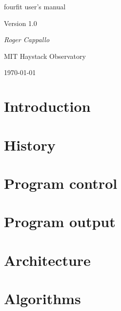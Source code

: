 \documentclass{article}
\begin{document}
\newcommand{\Oa}[1]{\hspace{-12pt}\makebox[12pt]{$\star$}#1}
\newcommand{\Da}[1]{\hspace{-12pt}\makebox[12pt]{$\times$}#1}
\newcommand{\bfit}[1]{{\textrm{\textit{\textmd{#1}}}}}


\begin{center}

\vspace{5pt}

{\LARGE fourfit user's manual}

\vspace{5pt}

{\Large Version 1.0}


\vspace{10pt}

{\it Roger Cappallo}

\vspace{5pt}

MIT Haystack Observatory

\vspace{5pt}
\today

\end{center}

\tableofcontents

\section{Introduction}


\section{History}


\section{Program control}


\section{Program output}


\section{Architecture}


\section{Algorithms}

\end{document}
